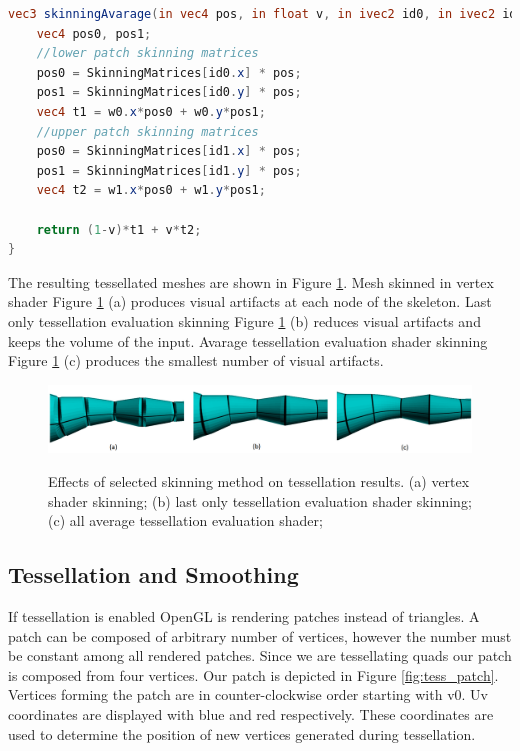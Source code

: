 \linespread{1.2}
\begin{lstlisting}[language=GLSL,caption={Linear Blend Skinning implemented in tessellation evaluation shader, with avaraging of skinning information from all patch vertices.},label={lst:te_avg_skin}]
vec3 skinningAvarage(in vec4 pos, in float v, in ivec2 id0, in ivec2 id1, in vec2 w0, in vec2 w1, in mat4 SkinningMatrices[SKINNING_MATRICES]) {
	vec4 pos0, pos1;
	//lower patch skinning matrices
	pos0 = SkinningMatrices[id0.x] * pos;
	pos1 = SkinningMatrices[id0.y] * pos;
	vec4 t1 = w0.x*pos0 + w0.y*pos1;
	//upper patch skinning matrices
	pos0 = SkinningMatrices[id1.x] * pos;
	pos1 = SkinningMatrices[id1.y] * pos;
	vec4 t2 = w1.x*pos0 + w1.y*pos1;

	return (1-v)*t1 + v*t2;
}
\end{lstlisting} 
\linespread{1.5}

The resulting tessellated meshes are shown in Figure \ref{fig:tess_skin_comp}.
Mesh skinned in vertex shader Figure \ref{fig:tess_skin_comp} (a) produces visual artifacts at each node of the skeleton.
Last only tessellation evaluation skinning Figure \ref{fig:tess_skin_comp} (b) reduces visual artifacts and keeps the volume of the input.
Avarage tessellation evaluation shader skinning Figure \ref{fig:tess_skin_comp} (c) produces the smallest number of visual artifacts.

\begin{figure}[h]
    \centering
    \includegraphics[width=\textwidth]{images/tess_comp}
    \label{fig:tess_skin_comp}
    \caption[Skinning and Tessellation]{Effects of selected skinning method on tessellation results. (a) vertex shader skinning; (b) last only tessellation evaluation shader skinning; (c) all average tessellation evaluation shader;}
\end{figure}

\subsection{Tessellation and Smoothing}

If tessellation is enabled OpenGL is rendering patches instead of triangles.
A patch can be composed of arbitrary number of vertices, however the number must be constant among all rendered patches.
Since we are tessellating quads our patch is composed from four vertices.
Our patch is depicted in Figure \ref{fig:tess_patch}.
Vertices forming the patch are in counter-clockwise order starting with v0.
Uv coordinates are displayed with blue and red respectively.
These coordinates are used to determine the position of new vertices generated during tessellation.

